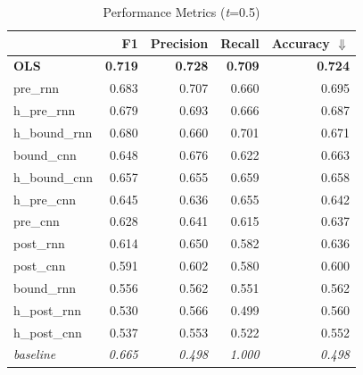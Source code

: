 \documentclass[conference]{IEEEtran}
\begin{document}
\begin{table}
\caption{Performance Metrics (\emph{t}=0.5)}
\smallskip
\begin{center}
\begin{tabular}{lrrrr}
\toprule
{} & F1 & Precision & Recall & Accuracy $\Downarrow$\\
\midrule
\bf{OLS} & \bf{0.719} & \bf{0.728} & \bf{0.709} & \bf{0.724} \\
pre\_rnn & 0.683 & 0.707 & 0.660 & 0.695 \\
h\_pre\_rnn & 0.679 & 0.693 & 0.666 & 0.687 \\
h\_bound\_rnn & 0.680 & 0.660 & 0.701 & 0.671 \\
bound\_cnn & 0.648 & 0.676 & 0.622 & 0.663 \\
h\_bound\_cnn & 0.657 & 0.655 & 0.659 & 0.658 \\
h\_pre\_cnn & 0.645 & 0.636 & 0.655 & 0.642 \\
pre\_cnn & 0.628 & 0.641 & 0.615 & 0.637 \\
post\_rnn & 0.614 & 0.650 & 0.582 & 0.636 \\
post\_cnn & 0.591 & 0.602 & 0.580 & 0.600 \\
bound\_rnn & 0.556 & 0.562 & 0.551 & 0.562 \\
h\_post\_rnn & 0.530 & 0.566 & 0.499 & 0.560 \\
h\_post\_cnn & 0.537 & 0.553 & 0.522 & 0.552 \\
\emph{baseline} & \emph{0.665} & \emph{0.498} & \emph{1.000} & \emph{0.498} \\
\bottomrule
\end{tabular}

\end{center}
\end{table}
\end{document}
